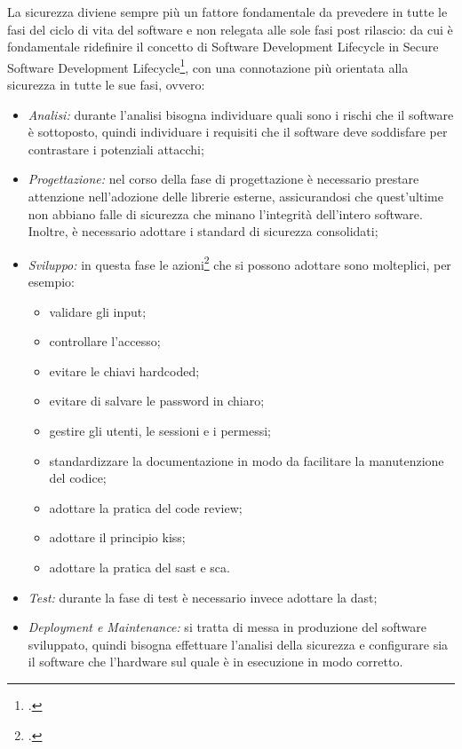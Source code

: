 La sicurezza diviene sempre più un fattore fondamentale da prevedere in tutte le fasi del ciclo di vita del software e non relegata alle sole fasi post rilascio: da cui è fondamentale ridefinire il concetto di Software Development Lifecycle in Secure Software Development Lifecycle\footcite{site:ssdl}, con una connotazione più orientata alla sicurezza in tutte le sue fasi, ovvero:
\begin{itemize}
    \item \textit{Analisi:} durante l'analisi bisogna individuare quali sono i rischi che il software è sottoposto, quindi individuare i requisiti che il software deve soddisfare per contrastare i potenziali attacchi;
    \item \textit{Progettazione:} nel corso della fase di progettazione è necessario prestare attenzione nell'adozione delle librerie esterne, assicurandosi che quest'ultime non abbiano falle di sicurezza che minano l'integrità dell'intero software.
    Inoltre, è necessario adottare i standard di sicurezza consolidati;
    \item \textit{Sviluppo:} in questa fase le azioni\footcite{site:security-best-practice} che si possono adottare sono molteplici, per esempio:
    \begin{itemize}
        \item validare gli input;
        \item controllare l'accesso;
        \item evitare le chiavi hardcoded;
        \item evitare di salvare le password in chiaro;
        \item gestire gli utenti, le sessioni e i permessi;
        \item standardizzare la documentazione in modo da facilitare la manutenzione del codice;
        \item adottare la pratica del code review;
        \item adottare il principio \gls{kiss};
        \item adottare la pratica del \gls{sast} e \gls{sca}.
    \end{itemize}
    \item \textit{Test:} durante la fase di test è necessario invece adottare la \gls{dast};
    \item \textit{Deployment e Maintenance:} si tratta di messa in produzione del software sviluppato, quindi bisogna effettuare l'analisi della sicurezza e configurare sia il software che l'hardware sul quale è in esecuzione in modo corretto.
\end{itemize}

